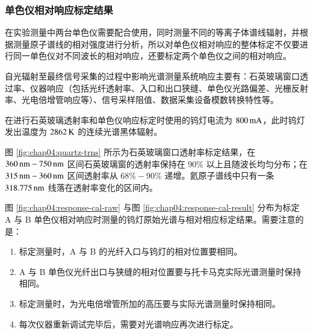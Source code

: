 \subsubsection{单色仪相对响应标定结果}

在实验测量中两台单色仪需要配合使用，同时测量不同的等离子体谱线辐射，并根据测量原子谱线的相对强度进行分析，所以对单色仪相对响应的整体标定不仅要进行同一单色仪对不同波长的相对响应，还要标定两个单色仪之间的相对响应。

自光辐射至最终信号采集的过程中影响光谱测量系统响应主要有：石英玻璃窗口透过率、仪器响应（包括光纤透射率、入口和出口狭缝、单色仪光路偏差、光栅反射率、光电倍增管响应等）、信号采样阻值、数据采集设备模数转换特性等。

在进行石英玻璃透射率和单色仪响应标定时使用的钨灯电流为 $800\,{\rm mA}$，此时钨灯发出温度为 $2862\,{\rm K}$ 的连续光谱黑体辐射。

图 \ref{fig:chap04:quartz-trns} 所示为石英玻璃窗口透射率标定结果，在 $360\,{\rm nm} - 750\,{\rm nm}$ 区间石英玻璃窗的透射率保持在 $90\%$ 以上且随波长均匀分布；在 $315\,{\rm nm} - 360\,{\rm nm}$ 区间透射率从 $68\% - 90\%$ 递增。氦原子谱线中只有一条 $318.775\,{\rm nm}$ 线落在透射率变化的区间内。

图 \ref{fig:chap04:response-cal-raw} 与图 \ref{fig:chap04:response-cal-result} 分布为标定 A 与 B 单色仪相对响应时测量的钨灯原始光谱与相对相应标定结果。需要注意的是：

\begin{enumerate}
  \item 标定测量时，A 与 B 的光纤入口与钨灯的相对位置要相同。
  \item A 与 B 单色仪光纤出口与狭缝的相对位置要与托卡马克实际光谱测量时保持相同。
  \item 标定测量时，为光电倍增管所加的高压要与实际光谱测量时保持相同。
  \item 每次仪器重新调试完毕后，需要对光谱响应再次进行标定。
\end{enumerate}

